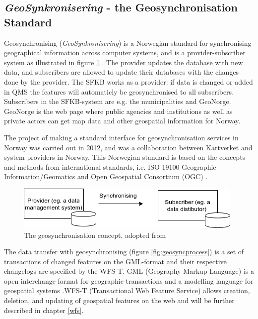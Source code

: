 


\subsection{\textit{GeoSynkronisering} - the Geosynchronisation Standard}\label{geosync}

Geosynchronising (\textit{GeoSynkronisering}) is a Norwegian standard for synchronising geographical information across computer systems, and is a provider-subscriber system as illustrated in figure \ref{fig:geosync} \citep{Kartverket2013}. The provider updates the database with new data, and subscribers are allowed to update their databases with the changes done by the provider. The SFKB works as a provider: if data is changed or added in QMS the features will automaticly be geosynchronised to all subscribers. Subscribers in the SFKB-system are e.g. the municipalities and GeoNorge. GeoNorge is the web page where public agencies and institutions as well as private actors can get map data and other geospatial information for Norway.  

The project of making a standard interface for geosynchronisation services in Norway was carried out in 2012, and was a collaboration between Kartverket and system providers in Norway. This Norwegian standard is based on the concepts and methods from international standards, i.e. ISO 19100 Geographic Information/Geomatics and Open Geospatial Consortium (OGC) \citep{Kartverket2013}.

 
\begin{figure}[H]
	\centering
	\includegraphics[scale=0.5]{img/geosync.png}
	\caption{The geosynchronisation concept, adopted from \cite[p.~16]{Kartverket2013} }
	\label{fig:geosync}
\end{figure}


The data transfer with geosynchronising (figure \ref{fig:geosyncprocess}) is a set of transactions of changed features on the GML-format and their respective changelogs are specified by the WFS-T.  GML (Geography Markup Language) is a open interchange format for geographic transactions and a modelling language for geospatial systems \citep{OGC2017}.WFS-T (Transactional Web Feature Service) allows creation, deletion, and updating of geospatial features on the web \citep{OGCNetwork} and will be further described in chapter \ref{wfs}. 

